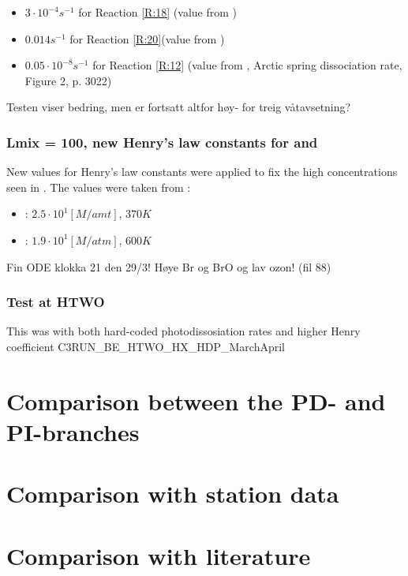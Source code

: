 \begin{itemize}
    \item $3\cdot10^{-4} s^{-1}$ for Reaction \ref{R:18} (value from \cite{CAO})
    \item $0.014 s^{-1}$ for Reaction \ref{R:20}(value from \cite{CAO})
    \item $0.05\cdot10^{-8} s^{-1}$ for Reaction \ref{R:12} (value from \cite{Papanastasiou2013}, Arctic spring dissociation rate, Figure 2, p. 3022)
\end{itemize}


Testen viser bedring, men  er fortsatt altfor høy- for treig våtavsetning? 

\subsubsection{Lmix = 100, new Henry's law constants for  and }\label{sec:new_henrys_law}

New values for Henry's law constants were applied to fix the high concentrations seen in . The values were taken from \cite{dean1999}:

\begin{itemize}
    \item {}: $2.5 \cdot 10^{1} [M/amt]$, $370 K$
    \item {}: $1.9\cdot10^1 [M/atm]$, $600 K$ 
\end{itemize}

Fin ODE klokka 21 den 29/3! Høye Br og BrO og lav ozon! (fil 88) 


\subsubsection{Test at HTWO}

This was with both hard-coded photodissosiation rates and higher Henry coefficient C3RUN\_BE\_HTWO\_HX\_HDP\_MarchApril

\section{Comparison between the PD- and PI-branches}

\section{Comparison with station data}

\section{Comparison with literature}

